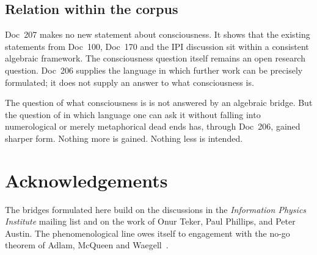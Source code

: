 \subsection{Relation within the corpus}

\begin{center}
\end{center}

Doc~207 makes no new statement about consciousness. It shows that the existing statements from Doc~100, Doc~170 and the IPI discussion sit within a consistent algebraic framework. The consciousness question itself remains an open research question. Doc~206 supplies the language in which further work can be precisely formulated; it does not supply an answer to what consciousness is.

\begin{philosophical}[Closing]
The question of what consciousness is is not answered by an algebraic bridge. But the question of in which language one can ask it without falling into numerological or merely metaphorical dead ends has, through Doc~206, gained sharper form. Nothing more is gained. Nothing less is intended.
\end{philosophical}

\section*{Acknowledgements}

The bridges formulated here build on the discussions in the \emph{Information Physics Institute} mailing list and on the work of Onur Teker, Paul Phillips, and Peter Austin. The phenomenological line owes itself to engagement with the no-go theorem of Adlam, McQueen and Waegell~\cite{Adlam2025}.

